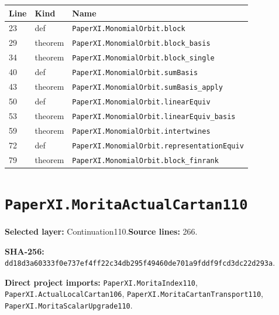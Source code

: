 \documentclass[10pt,oneside]{book}
\begin{document}
\begin{longtable}{@{}p{}p{}p{}@{}}\toprule Line&Kind&Name\\\midrule\endhead

23&def&\nolinkurl{PaperXI.MonomialOrbit.block}\\

29&theorem&\nolinkurl{PaperXI.MonomialOrbit.block_basis}\\

34&theorem&\nolinkurl{PaperXI.MonomialOrbit.block_single}\\

40&def&\nolinkurl{PaperXI.MonomialOrbit.sumBasis}\\

43&theorem&\nolinkurl{PaperXI.MonomialOrbit.sumBasis_apply}\\

50&def&\nolinkurl{PaperXI.MonomialOrbit.linearEquiv}\\

53&theorem&\nolinkurl{PaperXI.MonomialOrbit.linearEquiv_basis}\\

59&theorem&\nolinkurl{PaperXI.MonomialOrbit.intertwines}\\

72&def&\nolinkurl{PaperXI.MonomialOrbit.representationEquiv}\\

79&theorem&\nolinkurl{PaperXI.MonomialOrbit.block_finrank}\\

\bottomrule\end{longtable}

\section{\texorpdfstring{\nolinkurl{PaperXI.MoritaActualCartan110}}{PaperXI.MoritaActualCartan110}}\label{module:PaperXI.MoritaActualCartan110}

\textbf{Selected layer:} Continuation110.\quad\textbf{Source lines:} 266.\par\textbf{SHA-256:} {\scriptsize\nolinkurl{dd18d3a60333f0e737ef4ff22c34db295f49460de701a9fddf9fcd3dc22d293a}}.


\textbf{Direct project imports:} \nolinkurl{PaperXI.MoritaIndex110}, \nolinkurl{PaperXI.ActualLocalCartan106}, \nolinkurl{PaperXI.MoritaCartanTransport110}, \nolinkurl{PaperXI.MoritaScalarUpgrade110}.
\end{document}
